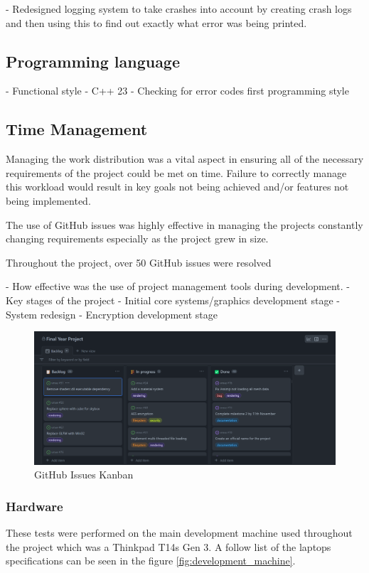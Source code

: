 \documentclass[11pt]{article}
\begin{document}
- Redesigned logging system to take crashes into account by creating crash logs
 and then using this to find out exactly what error was being printed.

\subsection{Programming language}
- Functional style
- C++ 23
- Checking for error codes first programming style

\subsection{Time Management}
Managing the work distribution was a vital aspect in ensuring all of the
necessary requirements of the project could be met on time. Failure to correctly 
manage this workload would result in key goals not being achieved and/or features
not being implemented.



The use of GitHub issues was highly effective in managing the projects
constantly changing requirements especially as the project grew in size.

Throughout the project, over 50 GitHub issues were resolved 

- How effective was the use of project management tools
during development.
- Key stages of the project
    - Initial core systems/graphics development stage
    - System redesign
    - Encryption development stage

\begin{figure}[h!]
  \centering
  \includegraphics[width=\textwidth]{images/github_project.png}
  \caption{GitHub Issues Kanban}
  \label{fig:github_kanban}
\end{figure}
    


\subsubsection{Hardware}
These tests were performed on the main development machine used throughout the
project which was a Thinkpad T14s Gen 3. A follow list of the laptops specifications
can be seen in the figure \ref{fig:development_machine}.
\end{document}
